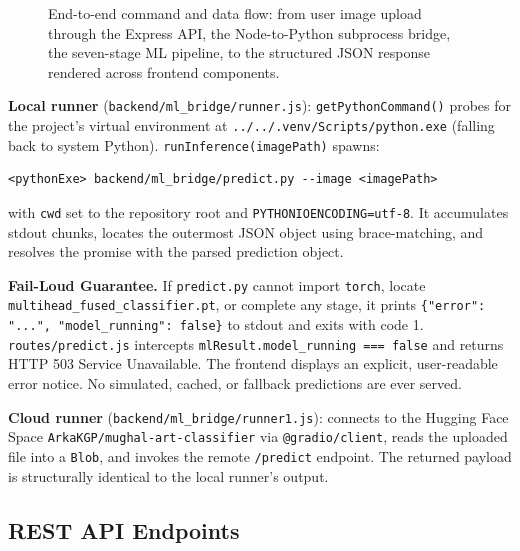 \documentclass[12pt, a4paper, twoside]{article}
\begin{document}
\begin{figure}[H]
{%
  }
  \caption{End-to-end command and data flow: from user image upload through the Express API, the Node-to-Python subprocess bridge, the seven-stage ML pipeline, to the structured JSON response rendered across frontend components.}
  \label{fig:dataflow}
\end{figure}

\textbf{Local runner} (\texttt{backend/ml\_bridge/runner.js}): \texttt{getPythonCommand()} probes for the project's virtual environment at \texttt{../../.venv/Scripts/python.exe} (falling back to system Python). \texttt{runInference(imagePath)} spawns:

\begin{lstlisting}[language={}, caption={ML bridge subprocess command}, label={lst:bridge}]
<pythonExe> backend/ml_bridge/predict.py --image <imagePath>
\end{lstlisting}

with \texttt{cwd} set to the repository root and \texttt{PYTHONIOENCODING=utf-8}. It accumulates stdout chunks, locates the outermost JSON object using brace-matching, and resolves the promise with the parsed prediction object.

\begin{warningbox}
  \textbf{Fail-Loud Guarantee.} If \texttt{predict.py} cannot import \texttt{torch}, locate \texttt{multihead\_fused\_classifier.pt}, or complete any stage, it prints \texttt{\{"error": "...", "model\_running": false\}} to stdout and exits with code 1. \texttt{routes/predict.js} intercepts \texttt{mlResult.model\_running === false} and returns HTTP 503 Service Unavailable. The frontend displays an explicit, user-readable error notice. No simulated, cached, or fallback predictions are ever served.
\end{warningbox}

\textbf{Cloud runner} (\texttt{backend/ml\_bridge/runner1.js}): connects to the Hugging Face Space \texttt{ArkaKGP/mughal-art-classifier} via \texttt{@gradio/client}, reads the uploaded file into a \texttt{Blob}, and invokes the remote \texttt{/predict} endpoint. The returned payload is structurally identical to the local runner's output.

\subsection{REST API Endpoints}
\end{document}
